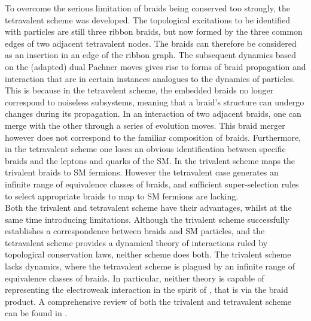 \documentclass[aps,nofootinbib,amsfonts,superscriptaddress]{revtex4}
\begin{document}
To overcome the serious limitation of braids being conserved too strongly, the tetravalent scheme was developed. The topological excitations to be identified with particles are still three ribbon braids, but now formed by the three common edges of two adjacent tetravalent nodes. The braids can therefore be considered as an insertion in an edge of the ribbon graph. The subsequent dynamics based on the (adapted) dual Pachner moves gives rise to forms of braid propagation and interaction that are in certain instances analogues to the dynamics of particles. This is because in the tetravelent scheme, the embedded braids no longer correspond to noiseless subsystems, meaning that a braid's structure can undergo changes during its propagation. In an interaction of two adjacent braids, one can merge with the other through a series of evolution moves. This braid merger however does not correspond to the familiar composition of braids. Furthermore, in the tetravalent scheme one loses an obvious identification between specific braids and the leptons and quarks of the SM. In the trivalent scheme \cite{BT} maps the trivalent braids to SM fermions. However the tetravalent case generates an infinite range of equivalence classes of braids, and sufficient super-selection rules to select appropriate braids to map to SM fermions are lacking. \\
%

Both the trivalent and tetravalent scheme have their advantages, whilst at the same time introducing limitations. Although the trivalent scheme successfully establishes a correspondence between braids and SM particles, and the tetravalent scheme provides a dynamical theory of interactions ruled by topological conservation laws, neither scheme does both. The trivalent scheme lacks dynamics, where the tetravalent scheme is plagued by an infinite range of equivalence classes of braids. In particular, neither theory is capable of representing the electroweak interaction in the spirit of \cite{BT}, that is via the braid product. A comprehensive review of both the trivalent and tetravalent scheme can be found in \cite{BT3}.\\
%
\end{document}
